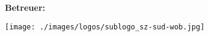 \begin{titlepage}
\begin{minipage}{\dimexpr\textwidth-0.6cm\relax}
        \vspace{0.5cm}

        {\Large{\textbf{Betreuer:}
            }}

    \end{minipage}

    \vspace{0.5em}


    \enlargethispage{10\baselineskip}

    \texttt{[image: ./images/logos/sublogo\_sz-sud-wob.jpg]}


\end{titlepage}

\restoregeometry